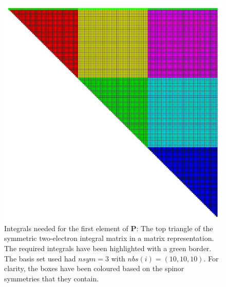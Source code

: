 \begin{figure}
\includegraphics[width=1\textwidth]{Figures/eint2_mat_lots.png}
\caption[Integrals needed for the first element of \textbf{P}: matrix representation]
{Integrals needed for the first element of \textbf{P}: The top triangle of the symmetric two-electron integral matrix in a matrix representation. The required integrals have been highlighted with a green border. The basis set used had $nsym=3$ with $nbs(i) = (10, 10, 10)$. For clarity, the boxes have been coloured based on the spinor symmetries that they contain.}
\label{fig:eint2matlots}
\end{figure}

